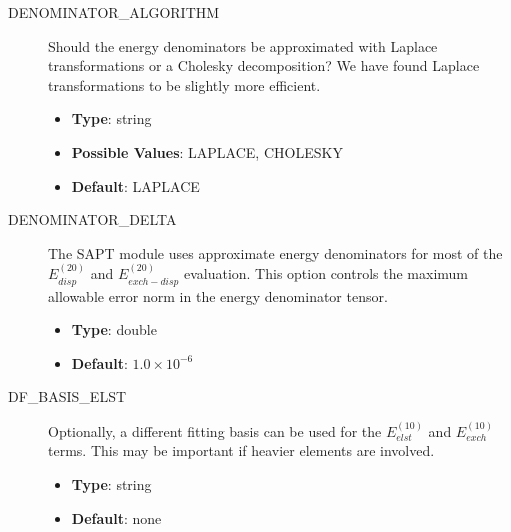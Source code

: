 \documentclass[letterpaper,10pt,english]{sphinxmanual}
\begin{document}
\begin{description}
\item[{DENOMINATOR\_ALGORITHM}] \leavevmode{}\label{index:term-24}
Should the energy denominators be approximated with Laplace
transformations or a Cholesky decomposition? We have found
Laplace transformations to be slightly more efficient.
\begin{itemize}
\item {} 
\textbf{Type}: string

\item {} 
\textbf{Possible Values}: LAPLACE, CHOLESKY

\item {} 
\textbf{Default}: LAPLACE

\end{itemize}

\end{description}
\begin{description}
\item[{DENOMINATOR\_DELTA}] \leavevmode{}\label{index:term-25}
The SAPT module uses approximate energy denominators for most of the
$E_{disp}^{(20)}$ and $E_{exch-disp}^{(20)}$ evaluation.
This option controls the maximum allowable error norm in the energy
denominator tensor.
\begin{itemize}
\item {} 
\textbf{Type}: double

\item {} 
\textbf{Default}: $1.0 \times 10^{-6}$

\end{itemize}

\end{description}
\begin{description}
\item[{DF\_BASIS\_ELST}] \leavevmode{}\label{index:term-26}
Optionally, a different fitting basis can be used for the
$E_{elst}^{(10)}$ and $E_{exch}^{(10)}$ terms.
This may be important if heavier elements are involved.
\begin{itemize}
\item {} 
\textbf{Type}: string

\item {} 
\textbf{Default}: none

\end{itemize}

\end{description}
\end{document}
